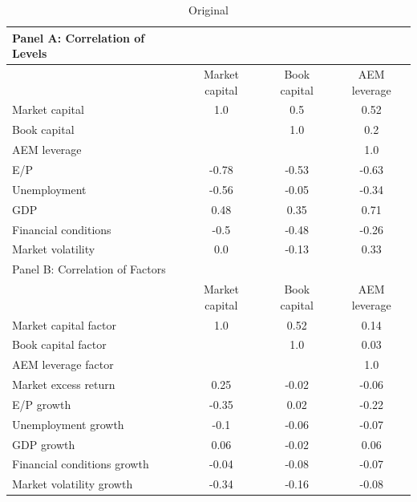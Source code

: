 \documentclass{article}
\begin{document}
    \begin{table}[htbp]
    \centering
    \caption{\label{tab:correlation}Original}
    \begin{adjustbox}{max width=\textwidth}
    \small
    \begin{tabular}{lccc}
        \toprule
        Panel A: Correlation of Levels \\
        \midrule
         & Market capital & Book capital & AEM leverage \\
        \midrule
        Market capital & 1.0 & 0.5 & 0.52 \\
Book capital &  & 1.0 & 0.2 \\
AEM leverage &  &  & 1.0 \\
E/P & -0.78 & -0.53 & -0.63 \\
Unemployment & -0.56 & -0.05 & -0.34 \\
GDP & 0.48 & 0.35 & 0.71 \\
Financial conditions & -0.5 & -0.48 & -0.26 \\
Market volatility & 0.0 & -0.13 & 0.33 \\
        \midrule
        Panel B: Correlation of Factors \\
        \midrule
         & Market capital & Book capital & AEM leverage \\
        \midrule
        Market capital factor & 1.0 & 0.52 & 0.14 \\
Book capital factor &  & 1.0 & 0.03 \\
AEM leverage factor &  &  & 1.0 \\
Market excess return & 0.25 & -0.02 & -0.06 \\
E/P growth & -0.35 & 0.02 & -0.22 \\
Unemployment growth & -0.1 & -0.06 & -0.07 \\
GDP growth & 0.06 & -0.02 & 0.06 \\
Financial conditions growth & -0.04 & -0.08 & -0.07 \\
Market volatility growth & -0.34 & -0.16 & -0.08 \\
        \bottomrule
    \end{tabular}
    \end{adjustbox}
    \end{table}
    
\end{document}
